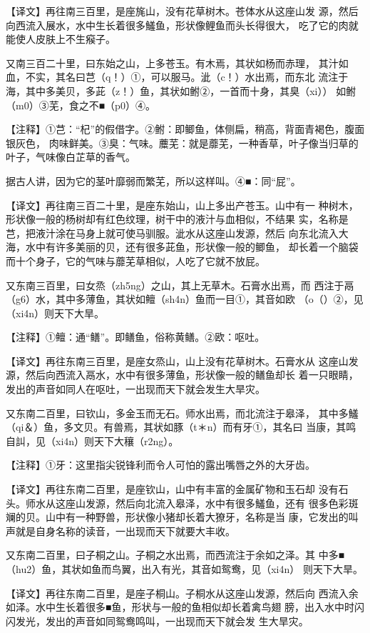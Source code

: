 \documentclass[a4paper,12pt,UTF8,twoside]{ctexbook}
\begin{document}
【译文】再往南三百里，是座旄山，没有花草树木。苍体水从这座山发 源，然后向西流入展水，水中生长着很多鱃鱼，形状像鲤鱼而头长得很大， 吃了它的肉就能使人皮肤上不生瘊子。

又南三百二十里，曰东始之山，上多苍玉。有木焉，其状如杨而赤理， 其汁如血，不实，其名曰芑（q！）①，可以服马。泚（c！）水出焉，而东北 流注于海，其中多美贝，多茈（z！）鱼，其状如鲋②，一首而十身，其臭（xi）） 如鲋（m0）③芜，食之不■（p0）④。

【注释】①芑：“杞”的假借字。②鲋：即鲫鱼，体侧扁，稍高，背面青褐色，腹面银灰色， 肉味鲜美。③臭：气味。蘪芜：就是蘼芜，一种香草，叶子像当归草的叶子，气味像白芷草的香气。

据古人讲，因为它的茎叶靡弱而繁芜，所以这样叫。④■：同“屁”。

【译文】再往南三百二十里，是座东始山，山上多出产苍玉。山中有一 种树木，形状像一般的杨树却有红色纹理，树干中的液汁与血相似，不结果 实，名称是芑，把液汁涂在马身上就可使马驯服。泚水从这座山发源，然后 向东北流入大海，水中有许多美丽的贝，还有很多茈鱼，形状像一般的鲫鱼， 却长着一个脑袋而十个身子，它的气味与蘼芜草相似，人吃了它就不放屁。

又东南三百里，曰女烝（zh5ng）之山，其上无草木。石膏水出焉，而 西注于鬲（g6）水，其中多薄鱼，其状如鳣（sh4n）鱼而一目①，其音如欧 （o（）②，见（xi4n）则天下大旱。

【注释】①鳣：通“鳝”。即鳝鱼，俗称黄鳝。②欧：呕吐。

【译文】再往东南三百里，是座女烝山，山上没有花草树木。石膏水从 这座山发源，然后向西流入鬲水，水中有很多薄鱼，形状像一般的鳝鱼却长 着一只眼睛，发出的声音如同人在呕吐，一出现而天下就会发生大旱灾。

又东南二百里，曰钦山，多金玉而无石。师水出焉，而北流注于皋泽， 其中多鱃（qi＆）鱼，多文贝。有兽焉，其状如豚（t＊n）而有牙①，其名曰 当康，其鸣自訆，见（xi4n）则天下大穰（r2ng）。

【注释】①牙：这里指尖锐锋利而令人可怕的露出嘴唇之外的大牙齿。

【译文】再往东南二百里，是座钦山，山中有丰富的金属矿物和玉石却 没有石头。师水从这座山发源，然后向北流入皋泽，水中有很多鱃鱼，还有 很多色彩斑斓的贝。山中有一种野兽，形状像小猪却长着大獠牙，名称是当 康，它发出的叫声就是自身名称的读音，一出现而天下就要大丰收。

又东南二百里，曰子桐之山。子桐之水出焉，而西流注于余如之泽。其 中多■（hu2）鱼，其状如鱼而鸟翼，出入有光，其音如鸳鸯，见（xi4n） 则天下大旱。

【译文】再往东南二百里，是座子桐山。子桐水从这座山发源，然后向 西流入余如泽。水中生长着很多■鱼，形状与一般的鱼相似却长着禽鸟翅 膀，出入水中时闪闪发光，发出的声音如同鸳鸯鸣叫，一出现而天下就会发 生大旱灾。
\end{document}
